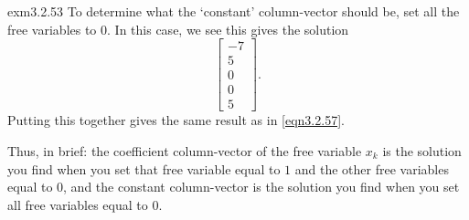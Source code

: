 \begin{exm}{}{exm3.2.53}
	To determine what the `constant' column-vector should be, set all the free variables to $0$.  In this case, we see this gives the solution
	\begin{equation}
		\begin{bmatrix}-7 \\ 5 \\ 0 \\ 0 \\ 5\end{bmatrix}.
	\end{equation}
	Putting this together gives the same result as in \eqref{eqn3.2.57}.
	
	Thus, in brief:  the coefficient column-vector of the free variable $x_k$ is the solution you find when you set that free variable equal to $1$ and the other free variables equal to $0$, and the constant column-vector is the solution you find when you set all free variables equal to $0$.
\end{exm}

